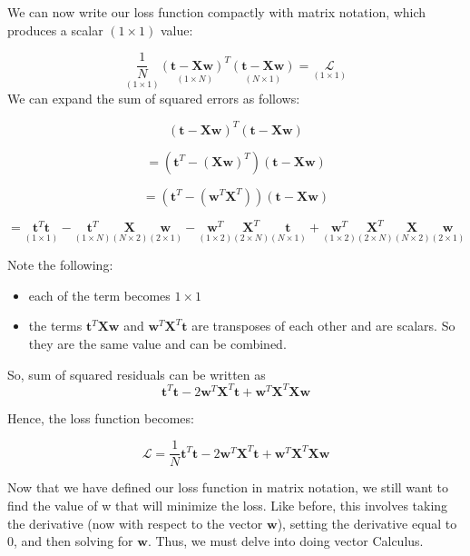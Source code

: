 \documentclass[
]{book}
\begin{document}
We can now write our loss function compactly with matrix notation, which
produces a scalar \((1 \times 1)\) value:

\[
\underset{(1 \times 1)}{\frac{1}{N}}
\underset{(1 \times N)}{(\mathbf{t} - \mathbf{Xw})^T}
\underset{(N \times 1)}{(\mathbf{t} - \mathbf{Xw})}
= 
\underset{(1 \times 1)}{\mathcal{L}}
\] We can expand the sum of squared errors as follows:

\[
(\mathbf{t} - \mathbf{Xw})^T(\mathbf{t} - \mathbf{Xw})\]

\[= (\mathbf{t}^T - (\mathbf{Xw})^T)(\mathbf{t} - \mathbf{Xw})\]

\[=(\mathbf{t}^T - (\mathbf{w}^T \mathbf{X}^T))(\mathbf{t} - \mathbf{Xw})\]

\begin{equation}
=\underset{(1 \times 1)}{\mathbf{t}^T\mathbf{t}} -
\underset{(1 \times N)}{\mathbf{t}^T}
\underset{(N \times 2)}{\mathbf{X}}
\underset{(2 \times 1)}{\mathbf{w}} -
\underset{(1 \times 2)}{\mathbf{w}^T}
\underset{(2 \times N)}{\mathbf{X}^T}
\underset{(N \times 1)}{\mathbf{t}} +
\underset{(1 \times 2)}{\mathbf{w}^T}
\underset{(2 \times N)}{\mathbf{X}^T}
\underset{(N \times 2)}{\mathbf{X}}
\underset{(2 \times 1)}{\mathbf{w}}
\end{equation}

Note the following:

\begin{itemize}
\item
  each of the term becomes \(1 \times 1\)
\item
  the terms \(\mathbf{t}^T \mathbf{Xw}\) and
  \(\mathbf{w}^T \mathbf{X}^T\mathbf{t}\) are transposes of each other
  and are scalars. So they are the same value and can be combined.
\end{itemize}

So, sum of squared residuals can be written as
\[\mathbf{t}^T\mathbf{t} - 2\mathbf{w}^T\mathbf{X}^T\mathbf{t} +
\mathbf{w}^T\mathbf{X}^T\mathbf{X}\mathbf{w}\]

Hence, the loss function becomes:

\[\mathcal{L} = \frac{1}{N}\mathbf{t}^T\mathbf{t} - 2\mathbf{w}^T\mathbf{X}^T\mathbf{t} +
\mathbf{w}^T\mathbf{X}^T\mathbf{X}\mathbf{w}\]

Now that we have defined our loss function in matrix notation, we still
want to find the value of w that will minimize the loss. Like before,
this involves taking the derivative (now with respect to the vector
\(\mathbf{w}\)), setting the derivative equal to 0, and then solving for
\(\mathbf{w}\). Thus, we must delve into doing vector Calculus.
\end{document}

